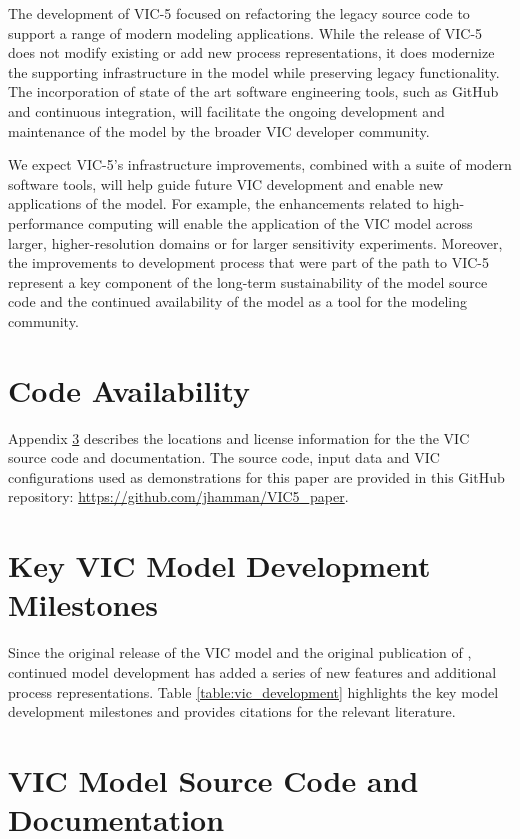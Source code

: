 \documentclass[gmd, manuscript]{copernicus}
\begin{document}
  The development of VIC-5 focused on refactoring the legacy source code to support a range of modern modeling applications. While the release of VIC-5 does not modify existing or add new process representations, it does modernize the supporting infrastructure in the model while preserving legacy functionality. The incorporation of state of the art software engineering tools, such as GitHub and continuous integration, will facilitate the ongoing development and maintenance of the model by the broader VIC developer community.

  We expect VIC-5's infrastructure improvements, combined with a suite of modern software tools, will help guide future VIC development and enable new applications of the model. For example, the enhancements related to high-performance computing will enable the application of the VIC model across larger, higher-resolution domains or for larger sensitivity experiments. Moreover, the improvements to development process that were part of the path to VIC-5 represent a key component of the long-term sustainability of the model source code and the continued availability of the model as a tool for the modeling community.

\section{Code Availability}
\label{appendix:code_avail}

  Appendix \ref{appendix:source_code} describes the locations and license information for the the VIC source code and documentation. The source code, input data and VIC configurations used as demonstrations for this paper are provided in this GitHub repository: \url{https://github.com/jhamman/VIC5_paper}.

\appendix

\section{Key VIC Model Development Milestones}
\label{appendix:model_development}

Since the original release of the VIC model and the original publication of \citet{Liang_1994}, continued model development has added a series of new features and additional process representations. Table \ref{table:vic_development} highlights the key model development milestones and provides citations for the relevant literature.

\section{VIC Model Source Code and Documentation}
\label{appendix:source_code}
\end{document}
